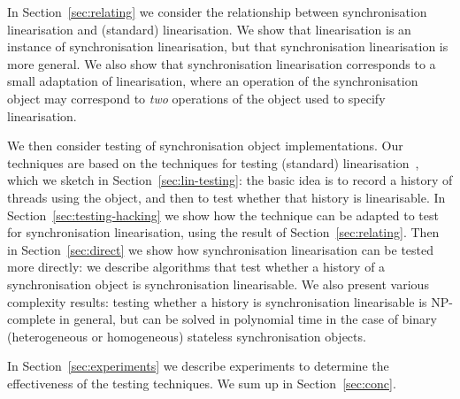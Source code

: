 In Section~\ref{sec:relating} we consider the relationship between
synchronisation linearisation and (standard) linearisation.  We show that
linearisation is an instance of synchronisation linearisation, but that
synchronisation linearisation is more general.  We also show that
synchronisation linearisation corresponds to a small adaptation of
linearisation, where an operation of the synchronisation object may correspond
to \emph{two} operations of the object used to specify linearisation.

We then consider testing of synchronisation object implementations.  Our
techniques are based on the techniques for testing (standard)
linearisation~\cite{gavin:lin-testing}, which we sketch in
Section~\ref{sec:lin-testing}: the basic idea is to record a history of
threads using the object, and then to test whether that history is
linearisable.
%
In Section~\ref{sec:testing-hacking} we show how the technique can be adapted
to test for synchronisation linearisation, using the result of
Section~\ref{sec:relating}.  Then in Section~\ref{sec:direct} we show how
synchronisation linearisation can be tested more directly: we describe
algorithms that test whether a history of a synchronisation object is
synchronisation linearisable.  We also present various
complexity results: testing whether a history is synchronisation linearisable
is NP-complete in general, but can be solved in polynomial time in the case of
binary (heterogeneous or homogeneous) stateless synchronisation objects.


In Section~\ref{sec:experiments} we describe experiments to determine the
effectiveness of the testing techniques.  We sum up in
Section~\ref{sec:conc}. 

